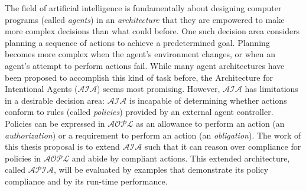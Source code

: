 The field of artificial intelligence is fundamentally about designing computer programs (called \textit{agents}) in an \textit{architecture} that they are empowered to make more complex decisions than what could before.
One such decision area considers planning a sequence of actions to achieve a predetermined goal.
Planning becomes more complex when the agent's environment changes, or when an agent's attempt to perform actions fail.
While many agent architectures have been proposed to accomplish this kind of task before, the Architecture for Intentional Agents ($\mathcal{AIA}$) seems most promising.
However, $\mathcal{AIA}$ has limitations in a desirable decision area: $\mathcal{AIA}$ is incapable of determining whether actions conform to rules (called \textit{policies}) provided by an external agent controller.
Policies can be expressed in $\mathcal{AOPL}$ as an allowance to perform an action (an \textit{authorization}) or a requirement to perform an action (an \textit{obligation}).
The work of this thesis proposal is to extend $\mathcal{AIA}$ such that it can reason over compliance for policies in $\mathcal{AOPL}$ and abide by compliant actions.
This extended architecture, called $\mathcal{APIA}$, will be evaluated by examples that demonstrate its policy compliance and by its run-time performance.
